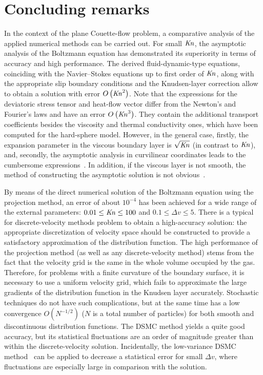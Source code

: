 \documentclass[]{jfm}
\newcommand{\Kn}{\mbox{\textit{Kn}}}
\newcommand{\OO}[1]{O\left(#1\right)}
\begin{document}
\section{Concluding remarks}

In the context of the plane Couette-flow problem,
a comparative analysis of the applied numerical methods can be carried out.
For small \(\Kn\), the asymptotic analysis of the Boltzmann equation has demonstrated
its superiority in terms of accuracy and high performance.
The derived fluid-dynamic-type equations,
coinciding with the Navier--Stokes equations up to first order of \(\Kn\),
along with the appropriate slip boundary conditions and the Knudsen-layer correction
allow to obtain a solution with error \(\OO{\Kn^2}\).
Note that the expressions for the deviatoric stress tensor and heat-flow vector
differ from the Newton's and Fourier's laws and have an error \(\OO{\Kn^3}\).
They contain the additional transport coefficients besides the viscosity and thermal conductivity ones,
which have been computed for the hard-sphere model.
However, in the general case, firstly, the expansion parameter in the viscous boundary layer
is \(\sqrt{\Kn}\) (in contrast to \(\Kn\)), and, secondly,
the asymptotic analysis in curvilinear coordinates leads to the cumbersome expressions~\citep{Sone2002}.
In addition, if the viscous layer is not smooth,
the method of constructing the asymptotic solution is not obvious~\citep{Aoki2014}.

By means of the direct numerical solution of the Boltzmann equation using the projection method,
an error of about \(10^{-4}\) has been achieved for a wide range of the external parameters:
\(0.01 \le \Kn \le 100\) and \(0.1 \le \Delta{v} \le 5\).
There is a typical for discrete-velocity methods problem to obtain a high-accuracy solution:
the appropriate discretization of velocity space should be constructed
to provide a satisfactory approximation of the distribution function.
The high performance of the projection method (as well as any discrete-velocity method)
stems from the fact that the velocity grid is the same in the whole volume occupied by the gas.
Therefore, for problems with a finite curvature of the boundary surface,
it is necessary to use a uniform velocity grid, which fails to approximate
the large gradients of the distribution function in the Knudsen layer accurately.
Stochastic techniques do not have such complications,
but at the same time has a low convergence \(\OO{N^{-1/2}}\)
(\(N\) is a total number of particles)
for both smooth and discontinuous distribution functions.
The DSMC method yields a quite good accuracy, but its statistical fluctuations
are an order of magnitude greater than within the discrete-velocity solution.
Incidentally, the low-variance DSMC method~\citep{Hadji2011}
can be applied to decrease a statistical error for small \(\Delta{v}\),
where fluctuations are especially large in comparison with the solution.
\end{document}
